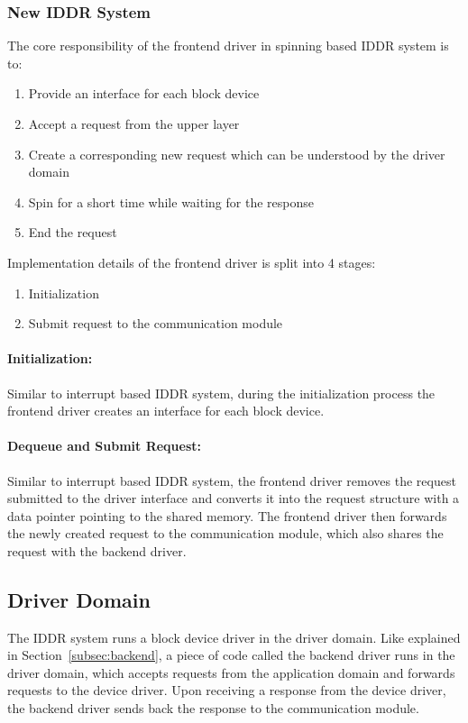 \subsubsection*{New IDDR System}
The core responsibility of the frontend driver in spinning based IDDR system is to:
\begin{enumerate}
\item Provide an interface for each block device
\item Accept a request from the upper layer
\item Create a corresponding new request which can be understood by the driver domain
\item Spin for a short time while waiting for the response
\item End the request
\end{enumerate}

Implementation details of the frontend driver is split into 4 stages:
\begin{enumerate}
\item Initialization
\item Submit request to the communication module
\end{enumerate}

\paragraph{Initialization:}
Similar to interrupt based IDDR system, during the initialization process the frontend driver creates an interface for each block device.

\paragraph{Dequeue and Submit Request:}
Similar to interrupt based IDDR system, the frontend driver removes the request submitted to the driver interface and converts it into the request structure with a data pointer pointing to the shared memory. The frontend driver then forwards the newly created request to the communication module, which also shares the request with the backend driver.

\subsection{Driver Domain}
The IDDR system runs a block device driver in the driver domain. Like explained in Section~\ref{subsec:backend}, a piece of code called the backend driver runs in the driver domain, which accepts requests from the application domain and forwards requests to the device driver. Upon receiving a response from the device driver, the backend driver sends back the response to the communication module.

